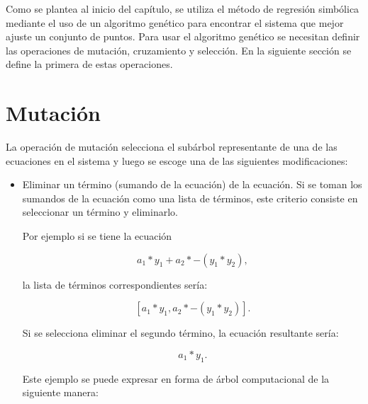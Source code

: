 Como se plantea al inicio del capítulo, se utiliza el método de regresión simbólica mediante el uso de un algoritmo genético para encontrar el sistema que mejor ajuste un conjunto de puntos. Para usar el algoritmo genético se necesitan definir las operaciones de mutación, cruzamiento y selección. En la siguiente sección se define la primera de estas operaciones.

\section{Mutación}\label{section:mutation}

La operación de mutación selecciona el subárbol representante de una de las ecuaciones en el sistema y luego se escoge una de las siguientes modificaciones:

\begin{itemize}
    \item Eliminar un término (sumando de la ecuación) de la ecuación. Si se toman los sumandos de la ecuación como una lista de términos, este criterio consiste en seleccionar un término y eliminarlo.

          Por ejemplo si se tiene la ecuación

          $$a_1 * y_1 + a_2 * -(y_1 * y_2),$$

          la lista de términos correspondientes sería:

          $$[a_1*y_1, a_2 * -(y_1 * y_2)].$$

          Si se selecciona eliminar el segundo término, la ecuación resultante sería:

          $$a_1 * y_1.$$

          Este ejemplo se puede expresar en forma de árbol computacional de la siguiente manera:


\end{itemize}
